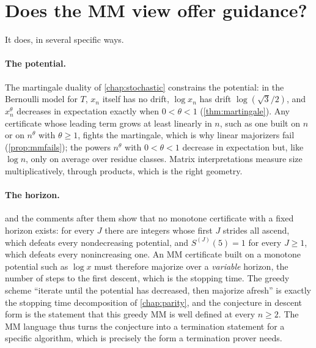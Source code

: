 \section{Does the MM view offer guidance?}\label{sec:ch10b:guidance}

It does, in several specific ways.

\paragraph{The potential.} The martingale duality of \cref{chap:stochastic}
constrains the potential: in the Bernoulli model for $T$, $x_n$ itself has no drift, $\log x_n$ has drift
$\log(\sqrt3/2)$, and $x_n^\theta$ decreases in expectation exactly when $0<\theta<1$ (\cref{thm:martingale}).
Any certificate whose leading term grows at least linearly in $n$, such as one built on $n$ or on $n^\theta$ with $\theta\ge1$, fights the martingale, which is why linear majorizers fail (\cref{prop:mmfails}); the powers $n^\theta$ with $0<\theta<1$ decrease in expectation but, like $\log n$, only on average over residue classes.
Matrix interpretations
measure size multiplicatively, through products, which is the right
geometry.

\paragraph{The horizon.}  and the comments after them show that no monotone certificate with a fixed horizon exists: for every $J$ there are integers whose first $J$ strides all ascend, which defeats every nondecreasing potential, and $S^{(J)}(5)=1$ for every $J\ge1$, which defeats every nonincreasing one. An MM certificate built on a monotone potential such as $\log x$ must
therefore majorize over a \emph{variable} horizon, the number of steps to the
first descent, which is the stopping time. The greedy scheme ``iterate until
the potential has decreased, then majorize afresh'' is exactly the stopping time
decomposition of \cref{chap:parity}, and the conjecture in descent form is the
statement that this greedy MM is well defined at every $n\ge2$. The MM language
thus turns the conjecture into a termination statement for a specific
algorithm, which is precisely the form a termination prover needs.

